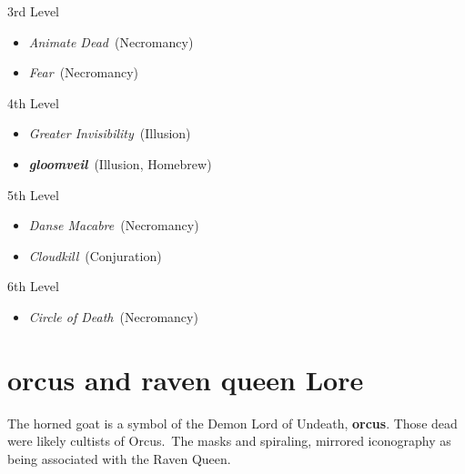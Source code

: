 \documentclass[10pt,twocolumn]{article}
\renewcommand{\textsc}[1]{\XCharterSC#1}
\let\oldtextbf\textbf
\renewcommand{\textbf}[1]{\oldtextbf{{#1}}}
\providecommand{\tightlist}{
  \setlength{\itemsep}{4pt}
  \setlength{\topsep}{0pt}
  \setlength{\parsep}{0pt}
  \setlength{\parskip}{0pt}
  \setlength{\partopsep}{0pt}
}
\begin{document}
3rd Level

\begin{itemize}
\tightlist
\item
  \emph{Animate Dead}~(Necromancy)
\item
  \emph{Fear}~(Necromancy)
\end{itemize}

4th Level

\begin{itemize}
\tightlist
\item
  \emph{Greater Invisibility}~(Illusion)
\item
  \emph{\textcolor{keywordcolor}{\textbf{\textsc{gloomveil}}}}~(Illusion,
  Homebrew)
\end{itemize}

5th Level

\begin{itemize}
\tightlist
\item
  \emph{Danse Macabre}~(Necromancy)
\item
  \emph{Cloudkill}~(Conjuration)
\end{itemize}

6th Level

\begin{itemize}
\tightlist
\item
  \emph{Circle of Death}~(Necromancy)
\end{itemize}

\section{\texorpdfstring{\textcolor{keywordcolor}{\textbf{\textsc{orcus}}}
and \textcolor{keywordcolor}{\textbf{\textsc{raven queen}}}
Lore}{ and  Lore}}\label{orcus-and-raven-queen-lore}

The horned goat is a symbol of the Demon Lord of Undeath,
\textcolor{keywordcolor}{\textbf{\textsc{orcus}}}. Those dead were
likely cultists of Orcus.~The masks and spiraling, mirrored iconography
as being associated with the Raven Queen.~
\end{document}
